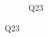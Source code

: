 \documentclass[english, 12pt, a4paper, pdftex, elec, utf8]{aaltothesis}
\begin{document}
\begin{figure}[h!]
\begin{subfigure}[b]{0.49\textwidth}
        \caption*{Q23}
    \end{subfigure}
\end{figure}

\clearpage




%
%
%
%
%
%
%
\end{document}
